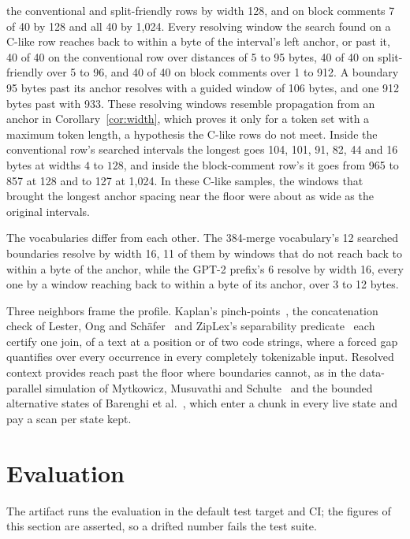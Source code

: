 \documentclass[11pt,a4paper]{article}
\theoremstyle{definition}
\theoremstyle{plain}
\begin{document}
the conventional and split-friendly rows by width 128, and on block comments 7 of 40 by 128 and all 40 by 1{,}024. Every
resolving window the search found on a C-like row reaches back to within a byte of the interval's left anchor, or past
it, 40 of 40 on the conventional row over distances of 5 to 95 bytes, 40 of 40 on split-friendly over 5 to 96, and 40 of
40 on block comments over 1 to 912. A boundary 95 bytes past its anchor resolves with a guided window of 106 bytes, and
one 912 bytes past with 933. These resolving windows resemble propagation from an anchor in Corollary~\ref{cor:width},
which proves it only for a token set with a maximum token length, a hypothesis the C-like rows do not meet. Inside the
conventional row's searched intervals the longest goes 104, 101, 91, 82, 44 and 16 bytes at widths $4$ to $128$, and
inside the block-comment row's it goes from 965 to 857 at 128 and to 127 at 1{,}024. In these C-like samples, the
windows that brought the longest anchor spacing near the floor were about as wide as the original intervals.

The vocabularies differ from each other. The 384-merge vocabulary's 12 searched boundaries resolve by width 16, 11 of
them by windows that do not reach back to within a byte of the anchor, while the GPT-2 prefix's 6 resolve by width 16,
every one by a window reaching back to within a byte of its anchor, over 3 to 12 bytes.

Three neighbors frame the profile. Kaplan's pinch-points~\cite{kaplan2005tokenizing}, the concatenation check of Lester,
Ong and Sch\"afer~\cite{lester2016flow} and ZipLex's separability predicate~\cite{chassot2026ziplex} each certify one
join, of a text at a position or of two code strings, where a forced gap quantifies over every occurrence in every
completely tokenizable input. Resolved context provides reach past the floor where boundaries cannot, as in the
data-parallel simulation of Mytkowicz, Musuvathi and Schulte~\cite{mytkowicz2014dpfsm} and the bounded alternative
states of Barenghi et al.~\cite{barenghi2015parallel}, which enter a chunk in every live state and pay a scan per state
kept.

\section{Evaluation}
\label{sec:evaluation}

The artifact runs the evaluation in the default test target and CI; the figures of this section are asserted, so a
drifted number fails the test suite.
\end{document}
